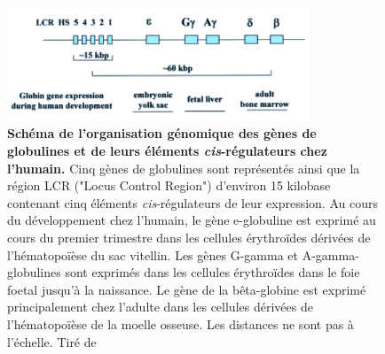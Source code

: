 \begin{figure}[h]
    \centering
    \includegraphics[width=0.8\textwidth, page=1] {figures/chap2/chap2-fig2.png}
    \caption[Schéma de l'organisation génomique des gènes de globulines et de leurs éléments \textit{cis}-régulateurs chez l'humain.]{
    \textbf{Schéma de l'organisation génomique des gènes de globulines et de leurs éléments \textit{cis}-régulateurs chez l'humain.}
    Cinq gènes de globulines sont représentés ainsi que la région LCR ("Locus Control Region") d'environ 15 kilobase contenant cinq éléments \textit{cis}-régulateurs de leur expression. Au cours du développement chez l'humain, le gène e-globuline est exprimé au cours du premier trimestre dans les cellules érythroïdes dérivées de l'hématopoïèse du sac vitellin. Les gènes G-gamma et A-gamma-globulines sont exprimés dans les cellules érythroïdes dans le foie foetal jusqu'à la naissance. Le gène de la bêta-globine est exprimé principalement chez l'adulte dans les cellules dérivées de l'hématopoïèse de la moelle osseuse.
    Les distances ne sont pas à l'échelle. Tiré de \citep{levings_human_2002}\\
    }
    \label{fig:chap2-fig2}
\end{figure} 

